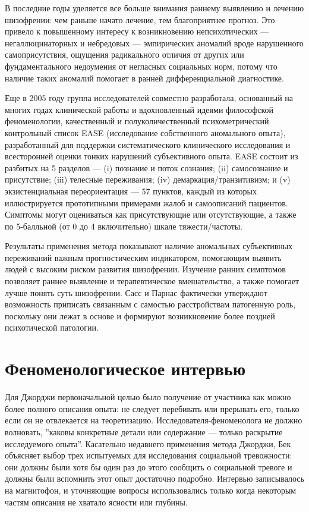 \documentclass[11pt]{book}
\begin{document}
\begin{enumerate}
В последние годы уделяется все больше внимания раннему выявлению и лечению шизофрении: чем раньше начато лечение, тем благоприятнее прогноз. Это привело к повышенному интересу к возникновению непсихотических --- негаллюцинаторных и небредовых --- эмпирических аномалий вроде нарушенного самоприсутствия, ощущения радикального отличия от других или фундаментального недоумения от негласных социальных норм, потому что наличие таких аномалий помогает в ранней дифференциальной диагностике.

Еще в 2005 году группа исследователей совместно разработала, основанный на многих годах клинической работы и вдохновленный идеями философской феноменологии, качественный и полуколичественный психометрический контрольный список EASE (исследование собственного аномального опыта), разработанный для поддержки систематического клинического исследования и всесторонней оценки тонких нарушений субъективного опыта. EASE состоит из разбитых на 5 разделов --- (i) познание и поток сознания; (ii) самосознание и присутствие; (iii) телесные переживания; (iv) демаркация/транзитивизм; и (v) экзистенциальная переориентация --- 57 пунктов, каждый из которых иллюстрируется прототипными примерами жалоб и самоописаний пациентов. Симптомы могут оцениваться как присутствующие или отсутствующие, а также по 5-балльной (от 0 до 4 включительно) шкале тяжести/частоты.

Результаты применения метода показывают наличие аномальных субъективных переживаний важным прогностическим индикатором, помогающим выявить людей с высоким риском развития шизофрении. Изучение ранних симптомов позволяет раннее выявление и терапевтическое вмешательство, а также помогает лучше понять суть шизофрении. Сасс и Парнас фактически утверждают возможность приписать связанным с самостью расстройствам патогенную роль, поскольку они лежат в основе и формируют возникновение более поздней психотической патологии.

\end{enumerate}

\section{Феноменологическое интервью}

Для Джорджи первоначальной целью было получение от участника как можно более полного описания опыта: не следует перебивать или прерывать его, только если он не отвлекается на теоретизацию. Исследователя-феноменолога не должно волновать, ''каковы конкретные детали или содержание --- только раскрытие исследуемого опыта''. Касательно недавнего применения метода Джорджи, Бек объясняет выбор трех испытуемых для исследования социальной тревожности: они должны были хотя бы один раз до этого сообщить о социальной тревоге и должны были вспомнить этот опыт достаточно подробно. Интервью записывалось на магнитофон, и уточняющие вопросы использовались только когда некоторым частям описания не хватало ясности или глубины.
\end{document}
